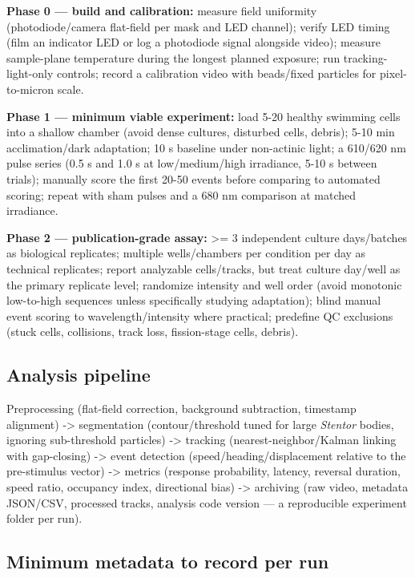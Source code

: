 \documentclass[
]{article}
\begin{document}
\textbf{Phase 0 --- build and calibration:} measure field uniformity
(photodiode/camera flat-field per mask and LED channel); verify LED
timing (film an indicator LED or log a photodiode signal alongside
video); measure sample-plane temperature during the longest planned
exposure; run tracking-light-only controls; record a calibration video
with beads/fixed particles for pixel-to-micron scale.

\textbf{Phase 1 --- minimum viable experiment:} load 5-20 healthy
swimming cells into a shallow chamber (avoid dense cultures, disturbed
cells, debris); 5-10 min acclimation/dark adaptation; 10 s baseline
under non-actinic light; a 610/620 nm pulse series (0.5 s and 1.0 s at
low/medium/high irradiance, 5-10 s between trials); manually score the
first 20-50 events before comparing to automated scoring; repeat with
sham pulses and a 680 nm comparison at matched irradiance.

\textbf{Phase 2 --- publication-grade assay:} \textgreater= 3
independent culture days/batches as biological replicates; multiple
wells/chambers per condition per day as technical replicates; report
analyzable cells/tracks, but treat culture day/well as the primary
replicate level; randomize intensity and well order (avoid monotonic
low-to-high sequences unless specifically studying adaptation); blind
manual event scoring to wavelength/intensity where practical; predefine
QC exclusions (stuck cells, collisions, track loss, fission-stage cells,
debris).

\hypertarget{analysis-pipeline}{%
\subsection{Analysis pipeline}\label{analysis-pipeline}}

Preprocessing (flat-field correction, background subtraction, timestamp
alignment) -\textgreater{} segmentation (contour/threshold tuned for
large \emph{Stentor} bodies, ignoring sub-threshold particles)
-\textgreater{} tracking (nearest-neighbor/Kalman linking with
gap-closing) -\textgreater{} event detection (speed/heading/displacement
relative to the pre-stimulus vector) -\textgreater{} metrics (response
probability, latency, reversal duration, speed ratio, occupancy index,
directional bias) -\textgreater{} archiving (raw video, metadata
JSON/CSV, processed tracks, analysis code version --- a reproducible
experiment folder per run).

\hypertarget{minimum-metadata-to-record-per-run}{%
\subsection{Minimum metadata to record per
run}\label{minimum-metadata-to-record-per-run}}
\end{document}
